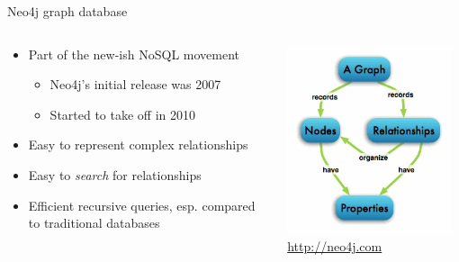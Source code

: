 \documentclass{beamer}
\begin{document}
\begin{frame}{Neo4j graph database}
	
\begin{columns} 
\begin{column}{0.65 \textwidth}
		\begin{itemize}
			\item Part of the new-ish NoSQL movement
			\begin{itemize}
				\item Neo4j's initial release was 2007
				\item Started to take off in 2010
			\end{itemize}
			\item Easy to represent complex relationships
			\item Easy to \emph{search} for relationships
			\item Efficient recursive queries, esp. compared to traditional databases
		\end{itemize}
		\end{column}
		\begin{column}{0.35\textwidth}
			\centering
	   \includegraphics[width=0.95\textwidth]{Figures/graphdb-neo4j.png}
       \\
    \tiny{\url{http://neo4j.com}}
  \end{column}
  \end{columns}

\end{frame}
\end{document}
